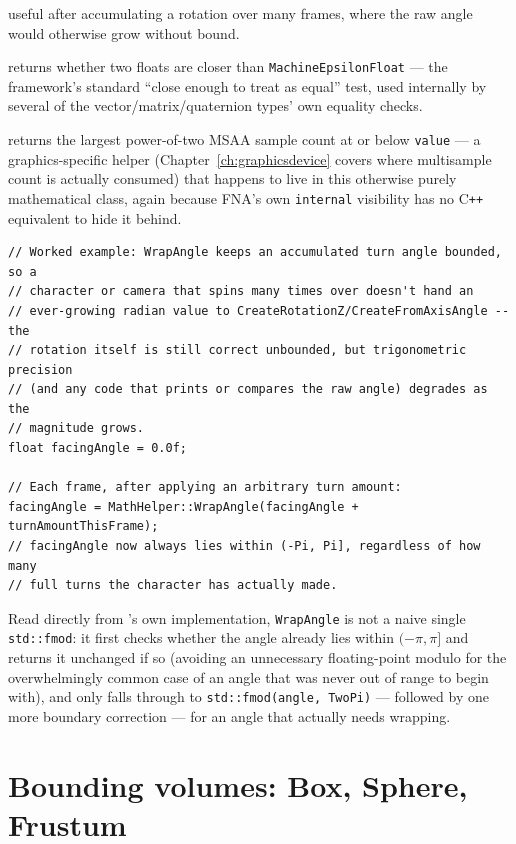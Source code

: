 \begin{description}
  useful after accumulating a rotation over many frames, where the raw angle would otherwise
  grow without bound.
\item[\texttt{WithinEpsilon(floatA, floatB)}] returns whether two floats are closer than
  \texttt{MachineEpsilonFloat} --- the framework's standard ``close enough to treat as equal''
  test, used internally by several of the vector/matrix/quaternion types' own equality checks.
\item[\texttt{ClosestMSAAPower(value)}] returns the largest power-of-two MSAA sample count at
  or below \texttt{value} --- a graphics-specific helper (Chapter~\ref{ch:graphicsdevice}
  covers where multisample count is actually consumed) that happens to live in this otherwise
  purely mathematical class, again because FNA's own \texttt{internal} visibility has no C\texttt{++}
  equivalent to hide it behind.
\end{description}

\begin{lstlisting}
// Worked example: WrapAngle keeps an accumulated turn angle bounded, so a
// character or camera that spins many times over doesn't hand an
// ever-growing radian value to CreateRotationZ/CreateFromAxisAngle -- the
// rotation itself is still correct unbounded, but trigonometric precision
// (and any code that prints or compares the raw angle) degrades as the
// magnitude grows.
float facingAngle = 0.0f;

// Each frame, after applying an arbitrary turn amount:
facingAngle = MathHelper::WrapAngle(facingAngle + turnAmountThisFrame);
// facingAngle now always lies within (-Pi, Pi], regardless of how many
// full turns the character has actually made.
\end{lstlisting}

Read directly from 's own implementation, \texttt{WrapAngle} is not a
naive single \texttt{std::fmod}: it first checks whether the angle already lies within
$(-\pi, \pi]$ and returns it unchanged if so (avoiding an unnecessary floating-point modulo
for the overwhelmingly common case of an angle that was never out of range to begin with),
and only falls through to \texttt{std::fmod(angle, TwoPi)} --- followed by one more
boundary correction --- for an angle that actually needs wrapping.

\section{Bounding volumes: Box, Sphere, Frustum}
\label{sec:bounding-volumes}

